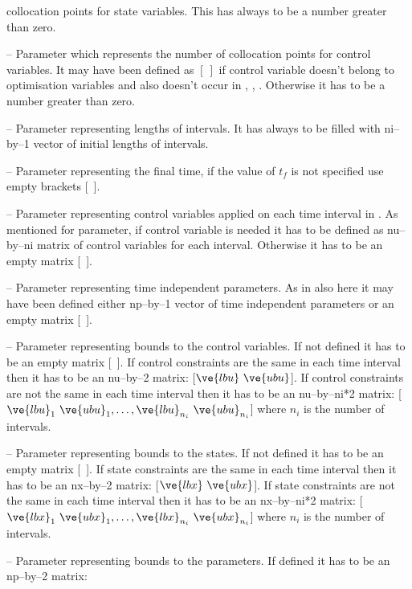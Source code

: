 \begin{description}
  collocation points for state variables. This has always to be a
  number greater than zero. 
\item[\argfun{ncolu}] -- Parameter which represents the number of
  collocation points for control variables. It may have been defined
  as $[~]$ if control variable doesn't belong to optimisation
  variables and also doesn't occur in , ,
  . Otherwise it has to be a number greater than zero.
\item[\argfun{li}] --  Parameter representing lengths of intervals. It
  has always to be filled with ni--by--1 vector of initial lengths of
  intervals. 
\item[\argfun{tf}] -- Parameter representing the final time, if the
  value of $t_{f}$ is not specified use empty brackets [~].
\item[\argfun{ui}] --  Parameter representing control variables
  applied on each time interval in . As mentioned for
   parameter, if control variable is needed it has to be
  defined as nu--by--ni matrix of control variables for each
  interval. Otherwise it has to be an empty matrix [~]. 
\item[\argfun{par}] -- Parameter representing time independent
  parameters. As in  also here it may have been defined
  either np--by--1 vector of time independent parameters or an empty
  matrix [~]. 
\item[\argfun{bdu}] -- Parameter representing bounds to the control
  variables. If not defined it has to be an empty matrix [~].  If
  control constraints are the same in each time interval then it has
  to be an nu--by--2 matrix: [$\ve{lbu}~\ve{ubu}$].  If control
  constraints are not the same in each time interval then it has to be
  an nu--by--ni*2 matrix: [$\ve{lbu}_1~\ve{ubu}_1, \ldots,
  \ve{lbu}_{n_i}~\ve{ubu}_{n_i}$] where $n_i$ is the number of intervals.
\item[\argfun{bdx}] -- Parameter representing bounds to the states.
  If not defined it has to be an empty matrix [~].  If state
  constraints are the same in each time interval then it has to be an
  nx--by--2 matrix: [$\ve{lbx}~\ve{ubx}$].  If state constraints are
  not the same in each time interval then it has to be an nx--by--ni*2
  matrix: [$\ve{lbx}_1~\ve{ubx}_1, \ldots,
  \ve{lbx}_{n_i}~\ve{ubx}_{n_i}$] where $n_i$ is the number of
  intervals.
\item[\argfun{bdp}] -- Parameter representing bounds to the
  parameters. If defined it has to be an np--by--2 matrix:

\end{description}
